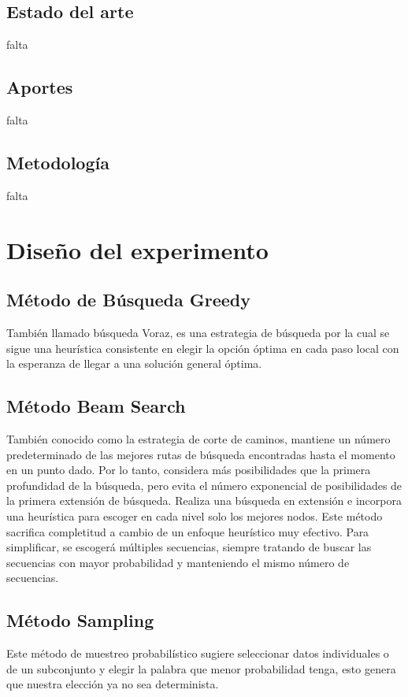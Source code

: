 \documentclass[10pt,twocolumn]{article}
\theoremstyle{definition}
\begin{document}
\subsection{Estado del arte}
falta

\subsection{Aportes }
falta

\subsection{Metodología}
falta


\section{Diseño del experimento}


\subsection{Método de Búsqueda Greedy}
También llamado búsqueda Voraz, es una estrategia de búsqueda por la cual se sigue una heurística consistente en elegir la opción óptima en cada paso local con la esperanza de llegar a una solución general óptima.

\subsection{Método Beam Search}
También conocido como la estrategia de corte de caminos, mantiene un número predeterminado de las mejores rutas de búsqueda encontradas hasta el momento en un punto dado. Por lo tanto, considera más posibilidades que la primera profundidad de la búsqueda, pero evita el número exponencial de posibilidades de la primera extensión de búsqueda.
Realiza una búsqueda en extensión e incorpora una heurística para escoger en cada nivel solo los mejores nodos. Este método sacrifica completitud a cambio de un enfoque heurístico muy efectivo. Para simplificar, se escogerá múltiples secuencias, siempre tratando de buscar las secuencias con mayor probabilidad y manteniendo el mismo número de secuencias.

\subsection{Método Sampling}
Este método de muestreo probabilístico sugiere seleccionar datos individuales o de un subconjunto y elegir la palabra que menor probabilidad tenga, esto genera que nuestra elección ya no sea determinista.
\end{document}
